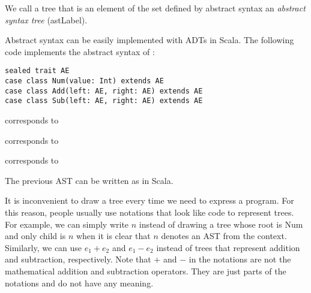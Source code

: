 We call a tree that is an element of the set defined by abstract syntax an
\textit{abstract syntax tree} (\acrshort{astLabel}).

Abstract syntax can be easily implemented with ADTs in Scala. The following code
implements the abstract syntax of \Lang:

\begin{verbatim}
sealed trait AE
case class Num(value: Int) extends AE
case class Add(left: AE, right: AE) extends AE
case class Sub(left: AE, right: AE) extends AE
\end{verbatim}

 corresponds to

\begin{center}
\end{center}

 corresponds to

\begin{center}
\end{center}

 corresponds to

\begin{center}
\end{center}

The previous AST can be written as  in Scala.

It is inconvenient to draw a tree every time we need to express a program. For
this reason, people usually use notations that look like code to represent
trees. For example, we can simply write $n$ instead of drawing a tree whose root
is Num and only child is $n$ when it is clear that $n$ denotes an AST
from the context. Similarly, we can use $e_1+e_2$ and $e_1-e_2$
instead of trees that represent addition and subtraction, respectively. Note that
$+$ and $-$ in the notations are not the mathematical addition and subtraction
operators. They are just parts of the notations and do not have any meaning.

